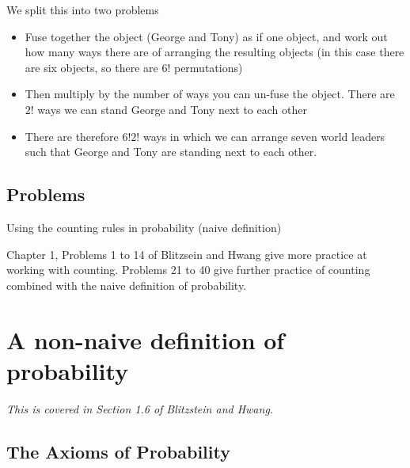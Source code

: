 \documentclass[12pt]{extbook}
\begin{document}
We split this into two problems
\begin{itemize}
\item Fuse together the object (George and Tony) as if one object, and work out how many ways there are of arranging the resulting objects (in this case there are six objects, so there are $6!$ permutations)
\item Then multiply by the number of ways you can un-fuse the object.   There are $2!$ ways we can stand George and Tony next to each other
\item There are therefore $6!2!$ ways in which we can arrange seven world leaders such that George and Tony are standing next to each other.
\end{itemize}


\section{Problems}

\begin{enumerate}







\end{enumerate}


Using the counting rules in probability (naive definition)

\begin{enumerate}

\end{enumerate}


Chapter 1, Problems 1 to 14 of Blitzsein and Hwang give more practice at working with counting.  Problems 21 to 40 give further practice of counting combined with the naive definition of probability.  


\chapter{A non-naive definition of probability}

\textit{This is covered in Section 1.6 of Blitzstein and Hwang.}

\section{The Axioms of Probability}
\end{document}
